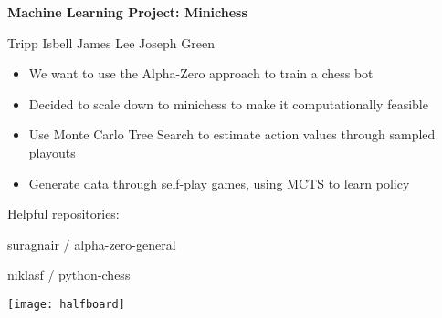 \documentclass[notitlepage, 8pt]{slides}
\title{}
\author{}
\begin{document}
\textbf{Machine Learning Project: Minichess}

\begin{small}
Tripp Isbell \hspace{1cm} James Lee \hspace{1cm} Joseph Green
\vspace{0.5cm}
\begin{itemize}\setlength\itemsep{0.5em}
	\item We want to use the Alpha-Zero approach to train a chess bot
	\item Decided to scale down to minichess to make it computationally feasible
	\item Use Monte Carlo Tree Search to estimate action values through sampled playouts
	\item Generate data through self-play games, using MCTS to learn policy
\end{itemize}

\end{small}
\begin{minipage}{0.5\textwidth}
Helpful repositories:
\vspace{0.5cm}

suragnair / alpha-zero-general

\vspace{0.5cm}
niklasf / python-chess
\end{minipage}
\begin{minipage}{0.45\textwidth}
\texttt{[image: halfboard]}
\end{minipage}
\end{document}
